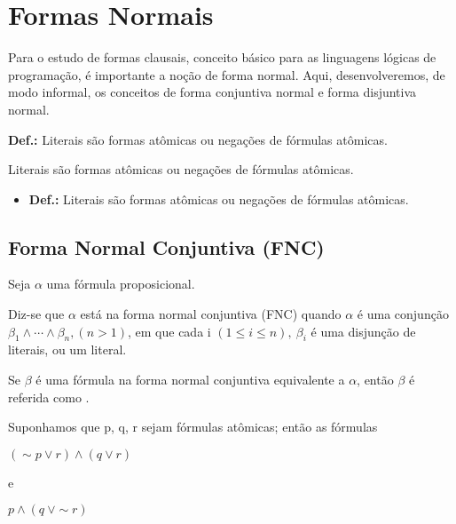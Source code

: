 \newpage

\newpage

\section{Formas Normais}
Para o estudo de formas clausais, conceito básico para as linguagens lógicas de programação, é importante a noção de forma normal.
Aqui, desenvolveremos, de modo informal, os conceitos de forma conjuntiva normal e forma disjuntiva normal.

\bigskip
\noindent
\textbf{Def.:}  Literais são formas atômicas ou negações de fórmulas atômicas.

\begin{defi}
Literais são formas atômicas ou negações de fórmulas atômicas.
\end{defi}

\begin{itemize}[label={},itemindent=-3em,leftmargin=\parindent]
    \item \textbf{Def.:} Literais são formas atômicas ou negações de fórmulas atômicas.
\end{itemize}

\subsection{Forma Normal Conjuntiva (FNC)}

Seja $\alpha$ uma fórmula proposicional.

\begin{defi}
    Diz-se que $\alpha$ está na forma normal conjuntiva (FNC) quando $\alpha$ é uma conjunção $\beta_1 \land \cdots \land \beta_n, (n > 1)$, em que cada i $(1 \leq i \leq n),\ \beta_i$ é uma disjunção de literais, ou um literal.
\end{defi}

\begin{defi}
    Se $\beta$ é uma fórmula na forma normal conjuntiva equivalente a $\alpha$, então $\beta$ é referida como .
\end{defi}

\begin{exemplo}
    Suponhamos que p, q, r sejam fórmulas atômicas; então as fórmulas
    \begin{center}
        $(\sim p \lor r) \land (q \lor r)$

        e

        $p \land (q\ \lor \sim r)$
    \end{center}
\end{exemplo}

